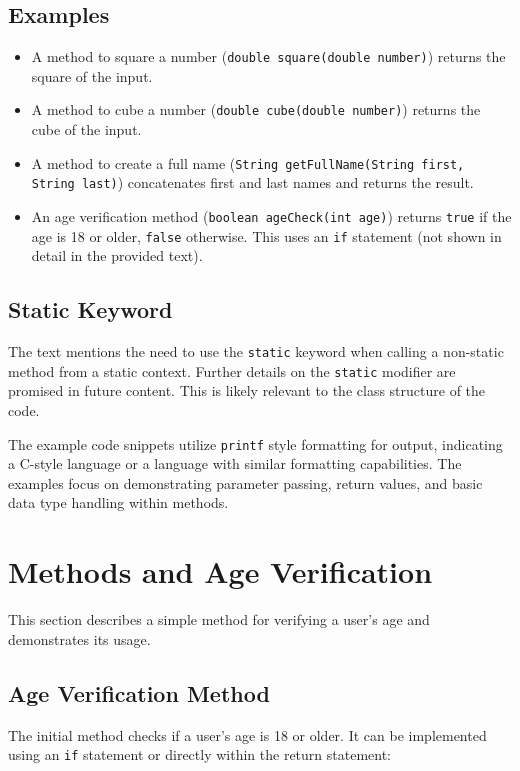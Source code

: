 \documentclass{article}
\begin{document}
\subsection{Examples}

\begin{itemize}
    \item A method to square a number (\texttt{double square(double number)}) returns the square of the input.
    \item A method to cube a number (\texttt{double cube(double number)}) returns the cube of the input.
    \item A method to create a full name (\texttt{String getFullName(String first, String last)}) concatenates first and last names and returns the result.
    \item An age verification method (\texttt{boolean ageCheck(int age)}) returns \texttt{true} if the age is 18 or older, \texttt{false} otherwise.  This uses an \texttt{if} statement (not shown in detail in the provided text).
\end{itemize}

\subsection{Static Keyword}

The text mentions the need to use the \texttt{static} keyword when calling a non-static method from a static context.  Further details on the \texttt{static} modifier are promised in future content.  This is likely relevant to the class structure of the code.

The example code snippets utilize \texttt{printf} style formatting for output, indicating a C-style language or a language with similar formatting capabilities.  The examples focus on demonstrating parameter passing, return values, and basic data type handling within methods.


\section{Methods and Age Verification}

This section describes a simple method for verifying a user's age and demonstrates its usage.

\subsection{Age Verification Method}

The initial method checks if a user's age is 18 or older.  It can be implemented using an \texttt{if} statement or directly within the return statement:
\end{document}
